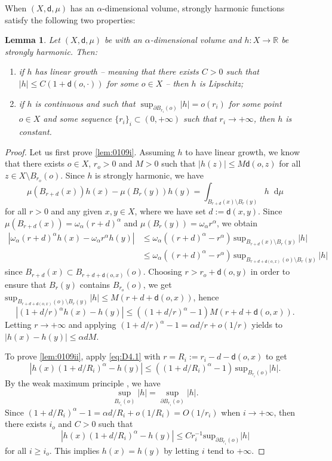 \documentclass[JEP,XML,SOM,Unicode,published]{cedram}
\newenvironment{enumeratei}
{\bgroup\def\theenumi{\roman{enumi}}\def\theenumii{\arabic{enumii}}\begin{enumerate}}
{\end{enumerate}\egroup}
\let\backslash\setminus
\theoremstyle{plain}
\newtheorem{lemma}[theorem]{Lemma}
\theoremstyle{definition}
\newcommand{\setR}{\mathbb{R}}
\newcommand{\di}{\mathop{}\!\mathrm{d}}
\newcommand{\dist}{\mathsf{d}}
\begin{document}
When $(X,\dist,\mu)$ has an $\alpha$-dimensional volume, strongly harmonic functions satisfy the following two properties:

\begin{lemma}\label{lem:0109}
Let $(X,\dist,\mu)$ be with an $\alpha$-dimensional volume and $h:X\to\setR$ be strongly harmonic. Then:
\begin{enumeratei}
\item\label{lem:0109i}
if $h$ has linear growth -- meaning that there exists $C>0$ such that $|h|\le C(1+\dist(o,\cdot))$ for some $o \in X$ -- then $h$ is Lipschitz;
\item\label{lem:0109ii}
if $h$ is continuous and such that $\sup_{\partial B_{r_i}(o)} |h| =o(r_i)$ for some point $o \in X$ and some sequence $\{r_i\}_i \subset (0,+\infty)$ such that $r_i \to +\infty$, then $h$ is constant.
\end{enumeratei}
\end{lemma}

\begin{proof}
Let us first prove \eqref{lem:0109i}. Assuming $h$ to have linear growth, we know that there exists $o \in X$, $r_o>0$ and $M>0$ such that $|h(z)| \le M\dist(o,z)$ for all $z \in X \backslash B_{r_o}(o)$. Since $h$ is strongly harmonic, we have
\[
\mu(B_{r+d}(x)) h(x) - \mu(B_r(y)) h(y) = \int_{B_{r+d}(x) \backslash B_r(y)} h \di \mu
\]
for all $r>0$ and any given $x,y \in X$, where we have set $d:=\dist(x,y)$. Since $\mu(B_{r+d}(x)) = \omega_\alpha (r+d)^\alpha$ and $\mu(B_r(y)) = \omega_\alpha r^\alpha$, we obtain
\begin{equation}\label{eq:D4.1}
\begin{aligned}
|\omega_\alpha (r+d)^\alpha h(x) - \omega_\alpha r^\alpha h(y)| & \le \omega_\alpha ((r+d)^\alpha - r^\alpha)\, \mathrm{sup}_{B_{r+d}(x)\backslash B_r(y)} \, |h| \\
& \le \omega_\alpha ((r+d)^\alpha - r^\alpha) \, \mathrm{sup}_{B_{r+d+\dist(o,x)}(o)\backslash B_r(y)} \, |h|
\end{aligned}
\end{equation}
since $B_{r+d}(x) \subset B_{r+d+\dist(o,x)}(o)$. Choosing $r>r_o+\dist(o,y)$ in order to ensure that $B_r(y)$ contains $B_{r_o}(o)$, we get $ \mathrm{sup}_{B_{r+d+\dist(o,x)}(o)\backslash B_r(y)} \, |h| \le M(r+d+\dist(o,x))$,
hence
\[
|(1+d/r)^\alpha h(x) - h(y)| \le ((1+d/r)^\alpha-1)M(r+d+\dist(o,x)).
\]
Letting $r \to +\infty$ and applying $(1+d/r)^\alpha-1 =\alpha d/r +o(1/r)$ yields to $|h(x) - h(y)| \le \alpha dM$.

To prove \eqref{lem:0109ii}, apply \eqref{eq:D4.1} with $r=R_i:=r_i-d-\dist(o,x)$ to get
\[
\left| h(x) (1+d/R_i)^\alpha - h(y)\right| \le ((1+d/R_i)^\alpha-1) \,\mathrm{sup}_{B_{r_i}(o)} |h|.
\]
By the weak maximum principle \cite[Cor.\,4.3]{AGG19}, we have
\[
\sup_{B_{r_i}(o)} |h| = \sup_{\partial B_{r_i}(o)} |h|.
\]
Since $(1+d/R_i)^\alpha-1= \alpha d/ R_i + o(1/R_i) = O(1/r_i)$ when $i\to +\infty$, then there exists $i_o$ and $C>0$ such that
\[
\left| h(x) (1+d/R_i)^\alpha - h(y)\right| \le C r_i^{-1}\mathrm{sup}_{\partial B_{r_i}(o)} |h|
\]
for all $i \ge i_o$. This implies $h(x)=h(y)$ by letting $i$ tend to $+\infty$.
\end{proof}
\end{document}
